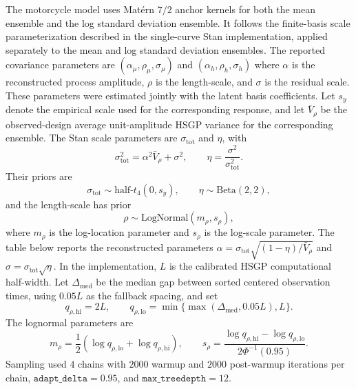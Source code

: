 \documentclass[11pt,a4paper]{article}
\theoremstyle{definition}
\theoremstyle{remark}
\begin{document}
\noindent The motorcycle model uses Mat\'ern \(7/2\) anchor kernels for both the mean ensemble and the log standard deviation ensemble. It follows the finite-basis scale parameterization described in the single-curve Stan implementation, applied separately to the mean and log standard deviation ensembles. The reported covariance parameters are $(\alpha_\mu,\rho_\mu,\sigma_\mu)$ and $(\alpha_h,\rho_h,\sigma_h)$ where \(\alpha\) is the reconstructed process amplitude, \(\rho\) is the length-scale, and \(\sigma\) is the residual scale. These parameters were estimated jointly with the latent basis coefficients. Let \(s_y\) denote the empirical scale used for the corresponding response, and let \(\bar V_\rho\) be the observed-design average unit-amplitude HSGP variance for the corresponding ensemble. The Stan scale parameters are \(\sigma_{\mathrm{tot}}\) and \(\eta\), with
\[
\sigma_{\mathrm{tot}}^2=\alpha^2\bar V_\rho+\sigma^2,
\qquad
\eta=\frac{\sigma^2}{\sigma_{\mathrm{tot}}^2}.
\]
Their priors are
\[
\sigma_{\mathrm{tot}}\sim \mathrm{half}\text{-}t_4(0,s_y),
\qquad
\eta\sim \mathrm{Beta}(2,2),
\]
and the length-scale has prior
\[
\rho\sim \mathrm{LogNormal}(m_\rho,s_\rho),
\]
where \(m_\rho\) is the log-location parameter and \(s_\rho\) is the log-scale parameter. The table below reports the reconstructed parameters \(\alpha=\sigma_{\mathrm{tot}}\sqrt{(1-\eta)/\bar V_\rho}\) and \(\sigma=\sigma_{\mathrm{tot}}\sqrt{\eta}\). In the implementation, \(L\) is the calibrated HSGP computational half-width. Let \(\Delta_{\mathrm{med}}\) be the median gap between sorted centered observation times, using \(0.05L\) as the fallback spacing, and set
\[
q_{\rho,\mathrm{hi}}=2L,
\qquad
q_{\rho,\mathrm{lo}}=\min\{\max(\Delta_{\mathrm{med}},0.05L),L\}.
\]
The lognormal parameters are
\[
m_\rho=\frac12(\log q_{\rho,\mathrm{lo}}+\log q_{\rho,\mathrm{hi}}),
\qquad
s_\rho=\frac{\log q_{\rho,\mathrm{hi}}-\log q_{\rho,\mathrm{lo}}}{2\Phi^{-1}(0.95)}.
\]
Sampling used \(4\) chains with \(2000\) warmup and \(2000\) post-warmup iterations per chain, \(\texttt{adapt\_delta}=0.95\), and \(\texttt{max\_treedepth}=12\).
\end{document}
